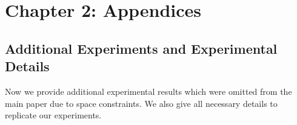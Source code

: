 
\chapter{Chapter 2: Appendices}



\newpage



\newpage



\newpage

\section{Additional Experiments and Experimental Details}\label{app:additional-experiments}

Now we provide additional experimental results which were omitted from the main paper due to space constraints.
We also give all necessary details to replicate our experiments.



















%





